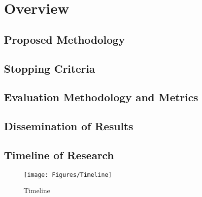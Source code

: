 \chapter{Overview}


\section{Proposed Methodology}

\section{Stopping Criteria}

\section{Evaluation Methodology and Metrics}

\section{Dissemination of Results}

\section{Timeline of Research}

\begin{figure}[h]
    \centering
    \texttt{[image: Figures/Timeline]}
    \caption{Timeline}
    \label{fig:timeline}
\end{figure}
